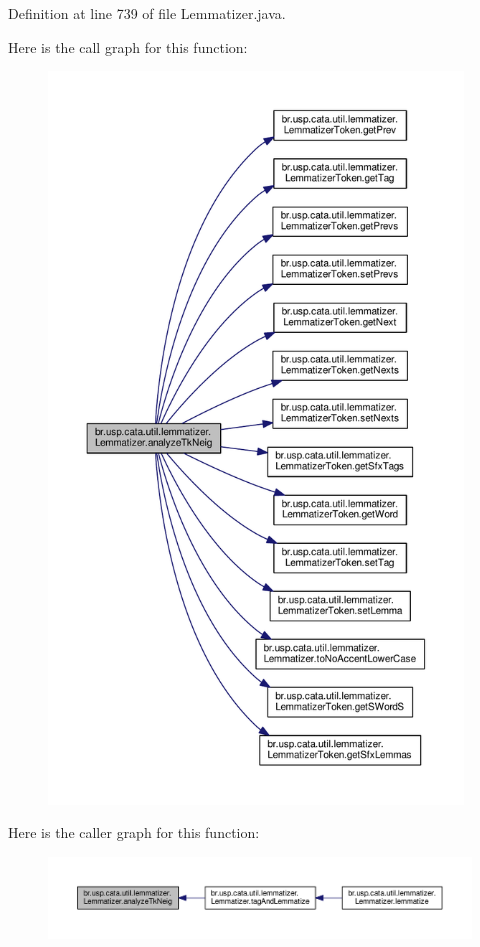 Definition at line 739 of file Lemmatizer.\+java.



Here is the call graph for this function\+:\nopagebreak
\begin{figure}[H]
\begin{center}
\leavevmode
\includegraphics[height=550pt]{classbr_1_1usp_1_1cata_1_1util_1_1lemmatizer_1_1_lemmatizer_a3b60e11a1def8a57fbe549eabebcfbf8_cgraph}
\end{center}
\end{figure}




Here is the caller graph for this function\+:\nopagebreak
\begin{figure}[H]
\begin{center}
\leavevmode
\includegraphics[width=350pt]{classbr_1_1usp_1_1cata_1_1util_1_1lemmatizer_1_1_lemmatizer_a3b60e11a1def8a57fbe549eabebcfbf8_icgraph}
\end{center}
\end{figure}



